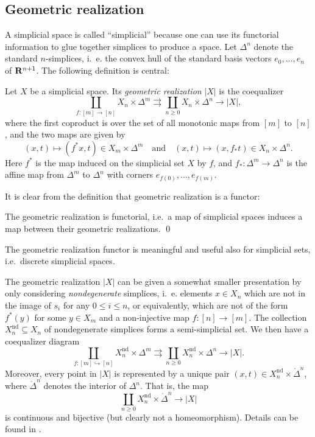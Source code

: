 \documentclass[a4paper,openany]{scrbook}
\begin{document}
\subsection{Geometric realization}

A simplicial space is called “simplicial” because one can use its functorial information to glue together simplices to produce a space. Let $\Delta^n$ denote the standard $n$-simplices, i.~e. the convex hull of the standard basis vectors $e_0,\dots,e_n$ of $\mathbf R^{n+1}$. The following definition is central:

\begin{defn}
Let $X$ be a simplicial space. Its \emph{geometric realization} $|X|$ is the coequalizer
\[
\coprod_{f\colon [m] \to [n]} X_n \times \Delta^m \rightrightarrows \coprod_{n \geq 0} X_n \times \Delta^n \to |X|,
\]
where the first coproduct is over the set of all monotonic maps from $[m]$ to $[n]$, and the two maps are given by
\[
(x,t) \mapsto (f^*x,t) \in X_m \times \Delta^m \quad \text{and} \quad (x,t) \mapsto (x,f_*t) \in X_n \times \Delta^n.
\]
Here $f^*$ is the map induced on the simplicial set $X$ by $f$, and $f_*\colon \Delta^m \to \Delta^n$ is the affine map from $\Delta^m$ to $\Delta^n$ with corners $e_{f(0)},\dots,e_{f(m)}$.
\end{defn}

It is clear from the definition that geometric realization is a functor:

\begin{lemma}
The geometric realization is functorial, i.e.\ a map of simplicial spaces induces a map between their geometric realizations. \qed
\end{lemma}

\begin{remark}
The geometric realization functor is meaningful and useful also for simplicial sets, i.e.\ discrete simplicial spaces.
\end{remark}

The geometric realization $|X|$ can be given a somewhat smaller presentation by only considering \emph{nondegenerate} simplices, i.~e. elements $x \in X_n$ which are not in the image of $s_i$ for any $0 \leq i \leq n$, or equivalently, which are not of the form $f^*(y)$ for some $y \in X_m$ and a non-injective map $f\colon [n] \to [m]$. The collection $X^{\operatorname{nd}}_n \subseteq X_n$ of nondegenerate simplices forms a semi-simplicial set. We then have a coequalizer diagram
\begin{equation}\label{eq:realizationwithnondegenerates}
\coprod_{f\colon [m] \hookrightarrow [n]} X^{\operatorname{nd}}_n \times \Delta^m \rightrightarrows \coprod_{n \geq 0} X^{\operatorname{nd}}_n \times \Delta^n \to |X|.
\end{equation}
Moreover, every point in $|X|$ is represented by a unique pair $(x,t) \in X^{\operatorname{nd}}_n \times \mathring\Delta^n$, where $\mathring\Delta^n$ denotes the interior of $\Delta^n$. That is, the map
\[
\coprod_{n \geq 0} X^{\operatorname{nd}}_n \times \mathring \Delta^n \to |X|
\]
is continuous and bijective (but clearly not a homeomorphism). Details can be found in \cite{milnor:57}.
\end{document}
